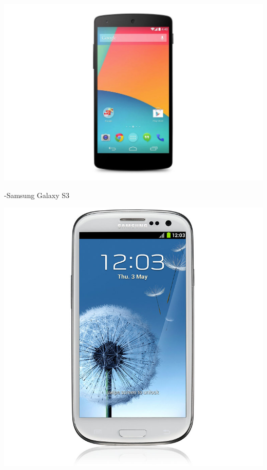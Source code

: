 \begin{center}
\includegraphics[width=1\textwidth]{imgs/nexus5.jpg}
\label{nexus_5_img}%
\end{center}

-Samsung Galaxy S3

\begin{center}
\includegraphics[width=1\textwidth]{imgs/galaxy_s3.jpg}
\label{galaxys3_img}%
\end{center}

